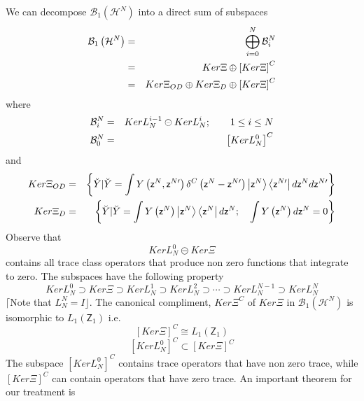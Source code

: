 \documentclass[aps,preprint]{revtex4}
\begin{document}
\qquad We can decompose $\mathcal{B}_{1}\left( \mathcal{H}^{N}\right) $ into
a direct sum of subspaces 
\begin{eqnarray}
\mathcal{B}_{1}\left( \mathcal{H}^{N}\right)  &=&\bigoplus_{i=0}^{N}\mathcal{%
B}_{i}^{N}  \notag \\
&=&Ker\Xi \oplus \left[ Ker\Xi \right] ^{C}  \notag \\
&=&Ker\Xi _{OD}\oplus Ker\Xi _{D}\oplus \left[ Ker\Xi \right] ^{C}
\end{eqnarray}%
where%
\begin{eqnarray}
\mathcal{B}_{i}^{N} &=&KerL_{N}^{i-1}\circleddash KerL_{N}^{i};\qquad 1\leq
i\leq N  \notag \\
\mathcal{B}_{0}^{N} &=&\left[ KerL_{N}^{0}\right] ^{C}
\end{eqnarray}%
and 
\begin{eqnarray}
Ker\Xi _{OD} &=&\left\{ \breve{Y}|\breve{Y}=\int Y\left( \mathsf{z}^{N},%
\mathsf{z}^{N\prime }\right) \delta ^{C}\left( \mathsf{z}^{N}-\mathsf{z}%
^{N\prime }\right) \left\vert \mathsf{z}^{N}\right\rangle \left\langle 
\mathsf{z}^{N\prime }\right\vert d\mathsf{z}^{N}d\mathsf{z}^{N\prime
}\right\}   \notag \\
Ker\Xi _{D} &=&\left\{ \breve{Y}|\breve{Y}=\int Y\left( \mathsf{z}%
^{N}\right) \left\vert \mathsf{z}^{N}\right\rangle \left\langle \mathsf{z}%
^{N}\right\vert d\mathsf{z}^{N};\quad \int Y\left( \mathsf{z}^{N}\right) d%
\mathsf{z}^{N}=0\right\} 
\end{eqnarray}%
Observe that 
\begin{equation}
KerL_{N}^{0}\circleddash Ker\Xi 
\end{equation}%
contains all trace class operators that produce non zero functions that
integrate to zero. The subspaces have the following property 
\begin{equation}
KerL_{N}^{0}\supset Ker\Xi \supset KerL_{N}^{1}\supset KerL_{N}^{2}\supset
\cdots \supset KerL_{N}^{N-1}\supset KerL_{N}^{N}
\end{equation}%
$\lceil $Note that $L_{N}^{N}=I\rfloor .$ The canonical compliment, $Ker\Xi
^{C}$ of $Ker\Xi $ in $\mathcal{B}_{1}\left( \mathcal{H}^{N}\right) $ is
isomorphic to $L_{1}\left( \mathsf{Z}_{1}\right) $ i.e.%
\begin{equation}
\left[ Ker\Xi \right] ^{C}\cong L_{1}\left( \mathsf{Z}_{1}\right) 
\end{equation}%
\begin{equation}
\left[ KerL_{N}^{0}\right] ^{C}\subset \left[ Ker\Xi \right] ^{C}
\end{equation}%
The subspace $\left[ KerL_{N}^{0}\right] ^{C}$ contains trace operators that
have non zero trace, while $\left[ Ker\Xi \right] ^{C}$ can contain
operators that have zero trace. An important theorem for our treatment is
\end{document}
